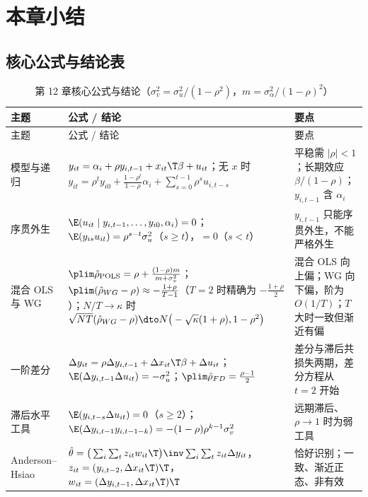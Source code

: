 \section{本章小结}\label{sec:U12c-summary}

\subsection{核心公式与结论表}

{\small
\renewcommand{\arraystretch}{1.3}
\begin{longtable}{>{\raggedright\arraybackslash}p{1.7cm}>{\raggedright\arraybackslash}p{8.0cm}>{\raggedright\arraybackslash}p{5.5cm}}
\caption{第 12 章核心公式与结论（$\sigma_v^2=\sigma_u^2/(1-\rho^2)$，$m=\sigma_\alpha^2/(1-\rho)^2$）}\label{tab:U12c-core}\\
\toprule
主题 & 公式 / 结论 & 要点\\
\midrule
\endfirsthead
\toprule
主题 & 公式 / 结论 & 要点\\
\midrule
\endhead
\bottomrule
\endfoot
模型与递归 & $y_{it}=\alpha_i+\rho y_{i,t-1}+x_{it}\T\beta+u_{it}$；无 $x$ 时 $y_{it}=\rho^ty_{i0}+\frac{1-\rho^t}{1-\rho}\alpha_i+\sum_{s=0}^{t-1}\rho^su_{i,t-s}$ & 平稳需 $|\rho|<1$；长期效应 $\beta/(1-\rho)$；$y_{i,t-1}$ 含 $\alpha_i$\\
\addlinespace
序贯外生 & $\E(u_{it}\mid y_{i,t-1},\dots,y_{i0},\alpha_i)=0$；$\E(y_{is}u_{it})=\rho^{s-t}\sigma_u^2$（$s\ge t$），$=0$（$s<t$） & $y_{i,t-1}$ 只能序贯外生，不能严格外生\\
\addlinespace
混合 OLS 与 WG & $\plim\hat\rho_{\text{POLS}}=\rho+\frac{(1-\rho)m}{m+\sigma_v^2}$；$\plim(\hat\rho_{WG}-\rho)\approx-\frac{1+\rho}{T-1}$（$T=2$ 时精确为 $-\frac{1+\rho}{2}$）；$N/T\to\kappa$ 时 $\sqrt{NT}(\hat\rho_{WG}-\rho)\dto N\big(-\sqrt\kappa(1+\rho),1-\rho^2\big)$ & 混合 OLS 向上偏；WG 向下偏，阶为 $O(1/T)$；$T$ 大时一致但渐近有偏\\
\addlinespace
一阶差分 & $\Delta y_{it}=\rho\Delta y_{i,t-1}+\Delta x_{it}\T\beta+\Delta u_{it}$；$\E(\Delta y_{i,t-1}\Delta u_{it})=-\sigma_u^2$；$\plim\hat\rho_{FD}=\frac{\rho-1}{2}$ & 差分与滞后共损失两期，差分方程从 $t=2$ 开始\\
\addlinespace
滞后水平工具 & $\E(y_{i,t-s}\Delta u_{it})=0$（$s\ge2$）；$\E(\Delta y_{i,t-1}y_{i,t-1-k})=-(1-\rho)\rho^{k-1}\sigma_v^2$ & 远期滞后、$\rho\to1$ 时为弱工具\\
\addlinespace
Anderson--Hsiao & $\hat\theta=\big(\sum_i\sum_tz_{it}w_{it}\T\big)\inv\sum_i\sum_tz_{it}\Delta y_{it}$，$z_{it}=(y_{i,t-2},\Delta x_{it}\T)\T$，$w_{it}=(\Delta y_{i,t-1},\Delta x_{it}\T)\T$ & 恰好识别；一致、渐近正态、非有效\\

\end{longtable}}
